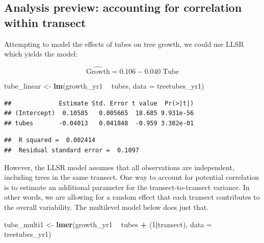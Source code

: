 \documentclass[
]{krantz}
\newenvironment{Shaded}{\begin{snugshade}}{\end{snugshade}}
\newcommand{\DataTypeTok}[1]{\textcolor[rgb]{0.27,0.27,0.27}{#1}}
\newcommand{\DecValTok}[1]{\textcolor[rgb]{0.06,0.06,0.06}{#1}}
\newcommand{\KeywordTok}[1]{\textcolor[rgb]{0.27,0.27,0.27}{\textbf{#1}}}
\newcommand{\NormalTok}[1]{#1}
\newcommand{\OperatorTok}[1]{\textcolor[rgb]{0.43,0.43,0.43}{\textbf{#1}}}
\newcommand{\StringTok}[1]{\textcolor[rgb]{0.5,0.5,0.5}{#1}}
\begin{document}
\hypertarget{analysis-preview-accounting-for-correlation-within-transect}{%
\subsection{Analysis preview: accounting for correlation within transect}\label{analysis-preview-accounting-for-correlation-within-transect}}

Attempting to model the effects of tubes on tree growth, we could use LLSR which yields the model:

\begin{equation}
  \hat{\textrm{Growth}} = 0.106 - 0.040\; \textrm{Tube}
\end{equation}

\begin{Shaded}
\begin{Highlighting}[]
\NormalTok{tube_linear <-}\StringTok{ }\KeywordTok{lm}\NormalTok{(growth_yr1 }\OperatorTok{~}\StringTok{ }\NormalTok{tubes, }\DataTypeTok{data =}\NormalTok{ treetubes_yr1)}
\end{Highlighting}
\end{Shaded}

\begin{verbatim}
##             Estimate Std. Error t value  Pr(>|t|)
## (Intercept)  0.10585   0.005665  18.685 9.931e-56
## tubes       -0.04013   0.041848  -0.959 3.382e-01
\end{verbatim}

\begin{verbatim}
##  R squared =  0.002414 
##  Residual standard error =  0.1097
\end{verbatim}

However, the LLSR model assumes that all observations are independent, including trees in the same transect. One way to account for potential correlation is to estimate an additional parameter for the transect-to-transect variance. In other words, we are allowing for a random effect that each transect contributes to the overall variability. The multilevel model below does just that.

\begin{Shaded}
\begin{Highlighting}[]
\NormalTok{tube_multi1 <-}\StringTok{ }\KeywordTok{lmer}\NormalTok{(growth_yr1 }\OperatorTok{~}\StringTok{ }\NormalTok{tubes }\OperatorTok{+}\StringTok{ }\NormalTok{(}\DecValTok{1}\OperatorTok{|}\NormalTok{transect), }
                    \DataTypeTok{data =}\NormalTok{ treetubes_yr1)}
\end{Highlighting}
\end{Shaded}
\end{document}
